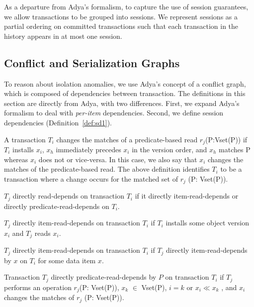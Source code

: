 As a departure from Adya's formalism, to capture the use of session
guarantees, we allow transactions to be grouped into sessions. We
represent sessions as a partial ordering on committed transactions
such that each transaction in the history appears in at most one
session.

\subsection{Conflict and Serialization Graphs}

To reason about isolation anomalies, we use Adya's concept of a
conflict graph, which is composed of dependencies between
transaction. The definitions in this section are directly from Adya,
with two differences. First, we expand Adya's formalism to deal
with \textit{per-item} dependencies. Second, we define session
dependencies (Definition~\ref{def:sd1}).

\begin{definition}
A transaction $T_i$ changes the matches
of a predicate-based read $r_j$(P:Vset(P)) if $T_i$ installs $x_i$, $x_h$
immediately precedes $x_i$ in the version order, and $x_h$ matches
P whereas $x_i$ does not or vice-versa. In this case, we also
say that $x_i$ changes the matches of the predicate-based read.
The above deﬁnition identiﬁes $T_i$ to be a transaction where
a change occurs for the matched set of $r_j$ (P: Vset(P)).
\end{definition}

\begin{definition}
$T_j$ directly read-depends on transaction $T_i$ if it directly
item-read-depends or directly predicate-read-depends on $T_i$.
\end{definition}

\begin{definition}
$T_j$ directly item-read-depends on transaction $T_i$ if $T_i$ installs some
  object version $x_i$ and $T_j$ reads $x_i$.
\end{definition}

\begin{definition}
$T_j$ directly item-read-depends on transaction $T_i$ if $T_j$
  directly item-read-depends by $x$ on $T_i$ for some data item $x$.
\end{definition}

\begin{definition}
Transaction $T_j$ directly predicate-read-depends by $P$ on
transaction $T_i$ if $T_j$ performs an operation $r_j$(P: Vset(P)),
$x_k$ $\in$ Vset(P), $i = k$ or $x_i \ll x_k$ , and $x_i$ changes the
matches of $r_j$ (P: Vset(P)).
\end{definition}

